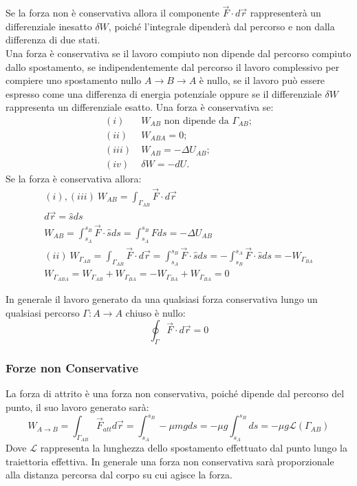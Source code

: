 \documentclass{article}
\numberwithin{equation}{subsection}
\begin{document}
Se la forza non è conservativa allora il componente $\vec{F}\cdot d\vec{r}$ rappresenterà un differenziale inesatto $\delta W$, poiché l'integrale dipenderà dal percorso 
e non dalla differenza di due stati. 
\\
Una forza è conservativa se il lavoro compiuto non dipende dal percorso compiuto dallo spostamento, se indipendentemente dal percorso il lavoro complessivo per compiere uno 
spostamento nullo $A\to B\to A$ è nullo, se il lavoro può essere espresso come una differenza di energia potenziale oppure se il differenziale $\delta W$ rappresenta un 
differenziale esatto. 
Una forza è conservativa se:
\begin{align*}
    (i)\:& W_{AB} \mbox{ non dipende da }\Gamma_{AB};\\
    (ii)\:&W_{ABA}=0;\\
    (iii)\:& W_{AB}=-\Delta U_{AB};\\
    (iv)\:& \delta W =-dU.
\end{align*}
Se la forza è conservativa allora:
\begin{gather*}
    (i),(iii)\:W_{AB}=\displaystyle\int_{\Gamma_{AB}}\vec{F}\cdot d\vec{r}\\
    d\vec{r}=\hat{s}ds\\
    W_{AB}=\int_{s_A}^{s_B}\vec{F}\cdot\hat{s}ds=\int_{s_A}^{s_B}F ds=-\Delta U_{AB} \\
    (ii)\:W_{\Gamma_{AB}}=\displaystyle\int_{\Gamma_{AB}}\vec{F}\cdot d\vec{r}=\int_{s_A}^{s_B}\vec{F}\cdot\hat{s}ds=-\int_{s_B}^{s_A}\vec{F}\cdot\hat{s}ds=-W_{\Gamma_{BA}}\\
    W_{\Gamma_{ABA}}=W_{\Gamma_{AB}}+W_{\Gamma_{BA}}=-W_{\Gamma_{BA}}+W_{\Gamma_{BA}}=0
\end{gather*}

In generale il lavoro generato da una qualsiasi forza conservativa lungo un qualsiasi percorso $\Gamma: A\to A $ chiuso è nullo:
\begin{equation*}
    \oint_{\Gamma}\vec{F}\cdot d\vec{r}=0
\end{equation*}

\subsubsection{Forze non Conservative}
La forza di attrito è una forza non conservativa, poiché dipende 
dal percorso del punto, il suo lavoro generato sarà:
\begin{equation}
    W_{A\to B}=\displaystyle\int_{\Gamma_{AB}}\vec{F}_{att}d\vec{r}=\int_{s_A}^{s_B}-\mu mgds=-\mu g\int_{s_A}^{s_B}ds=-\mu g\mathscr{L}(\Gamma_{AB})
\end{equation}
Dove $\mathscr{L}$ rappresenta la lunghezza dello spostamento effettuato dal punto lungo la traiettoria effettiva. In generale una forza non conservativa sarà proporzionale alla distanza percorsa dal corpo 
su cui agisce la forza. 
\end{document}
